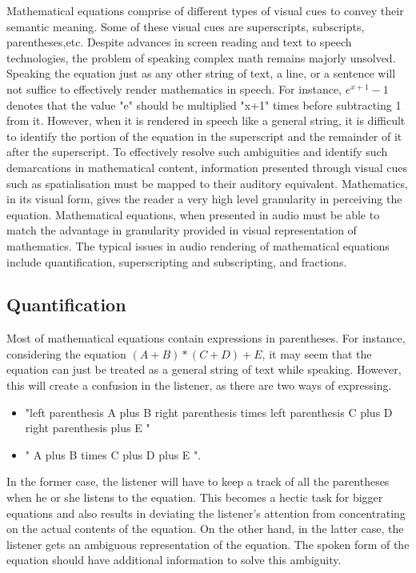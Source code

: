 \documentclass{article}
\begin{document}
	Mathematical equations comprise of different types of visual cues to convey their semantic meaning. Some of these visual cues are superscripts, subscripts, parentheses,etc. 
Despite advances in screen reading and text to speech technologies, the problem of speaking complex math remains majorly unsolved. Speaking the equation just as any other string of text, a line, or a sentence will not suffice to effectively render mathematics in speech. For instance, $e^{x+1}-1$ denotes that the value "e" should be multiplied "x+1" times before subtracting 1 from it. However, when it is rendered in speech like a general string, it is difficult to identify the portion of the equation in the superscript and the remainder of it after the superscript.
To effectively resolve such ambiguities and identify such demarcations in mathematical content, information presented through visual cues such as spatialisation must be mapped to their auditory equivalent. Mathematics, in its visual form, gives the reader a very high level granularity in perceiving the equation. Mathematical equations, when presented in audio must be able to match the advantage in granularity provided in visual representation of mathematics.   The typical issues in audio rendering of mathematical equations include quantification, superscripting and subscripting, and fractions.

\subsection{Quantification}
\label{ssec:quantify}
Most of mathematical equations contain expressions in parentheses. For instance, considering the equation
$(A+B)*(C+D)+E$, it may seem that the equation can just be treated as a general string of text while speaking. However, this will create a confusion in the listener, as there are two ways of expressing.
\begin{itemize}
\item  "left parenthesis A plus B right parenthesis times left parenthesis C plus D right parenthesis plus E " 
\item " A plus B times C plus D plus E ". 
\end{itemize}
In the former case, the listener will have to keep a track of all the parentheses when he or she listens to the equation. This becomes a hectic task for bigger equations and also results in deviating the listener's attention from concentrating on the actual contents of the equation. On the other hand, in the latter case, the listener gets an ambiguous representation of the equation. The spoken form of the equation should have additional information to solve this ambiguity.
\end{document}
